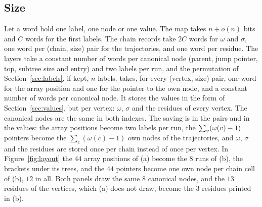 \subsection{Size}\label{sec:size}
Let a word hold one label, one node or one value.
%
The map takes $n+o(n)$ bits and $C$ words for the first labels.
%
The chain records take $2C$ words for $\omega$ and $\sigma$, one word per (chain, size) pair for the trajectories, and one word per residue.
%
The layers take a constant number of words per canonical node (parent, jump pointer, top, subtree size and entry) and two labels per run, and the permutation of Section~\ref{sec:labels}, if kept, $n$ labels.
%
\strees takes, for every (vertex, size) pair, one word for the array position and one for the pointer to the own node, and a constant number of words per canonical node.
%
It stores the values in the form of Section~\ref{sec:values}, but per vertex: $\omega$, $\sigma$ and the residues of every vertex.
%
The canonical nodes are the same in both indexes.
%
The saving is in the pairs and in the values: the array positions become two labels per run, the $\sum_v(\omega(v)-1)$ pointers become the $\sum_c(\omega(c)-1)$ own nodes of the trajectories, and $\omega$, $\sigma$ and the residues are stored once per chain instead of once per vertex.
%
In Figure~\ref{fig:layout} the $44$ array positions of (a) become the $8$ runs of (b), the brackets under its trees, and the $44$ pointers become one own node per chain cell of (b), $12$ in all.
%
Both panels draw the same $8$ canonical nodes, and the $13$ residues of the vertices, which (a) does not draw, become the $3$ residues printed in (b).

